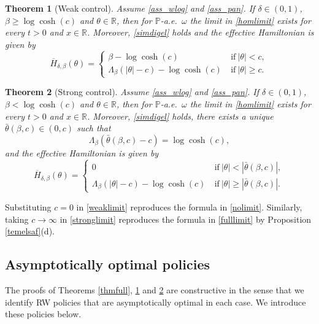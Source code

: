 \documentclass[a4paper]{amsart}
\numberwithin{equation}{section}
\theoremstyle{plain}
\newtheorem{theorem}{\sc Theorem}[section]
\theoremstyle{remark}
\begin{document}
\begin{theorem}[Weak control]\label{thmweak}
Assume \eqref{ass_wlog} and \eqref{ass_pan}. If $\delta\in(0,1)$, $\beta \ge \log\cosh(c)$ and $\theta\in\mathbb{R}$, then for $\mathbb{P}$-a.e.\ $\omega$ the limit in \eqref{homlimit} exists for every $t>0$ and $x\in\mathbb{R}$. Moreover, \eqref{simdigel} holds and the effective Hamiltonian is given by
\begin{equation}\label{weaklimit}
\overline H_{\delta,\beta}(\theta) = \begin{cases}
\beta - \log\cosh(c)&\ \text{if}\ |\theta| < c,\\
\Lambda_\beta(|\theta| - c) - \log\cosh(c)&\ \text{if}\ |\theta| \ge c.
\end{cases}
\end{equation}
\end{theorem}

\begin{theorem}[Strong control]\label{thmstrong}
Assume \eqref{ass_wlog} and \eqref{ass_pan}. If $\delta\in(0,1)$, $\beta < \log\cosh(c)$ and $\theta\in\mathbb{R}$, then for $\mathbb{P}$-a.e.\ $\omega$ the limit in \eqref{homlimit} exists for every $t>0$ and $x\in\mathbb{R}$. Moreover, \eqref{simdigel} holds, there exists a unique $\bar\theta(\beta,c)\in(0,c)$ such that
$$\Lambda_\beta(\bar\theta(\beta,c)-c) = \log\cosh(c),$$
and the effective Hamiltonian is given by
\begin{equation}\label{stronglimit}
\overline H_{\delta,\beta}(\theta) = \begin{cases}
0&\ \text{if}\ |\theta| < |\bar\theta(\beta,c)|,\\
\Lambda_{\beta}(|\theta| - c) - \log\cosh(c)&\ \text{if}\ |\theta| \ge |\bar\theta(\beta,c)|.
\end{cases}
\end{equation}
\end{theorem}

Substituting $c=0$ in \eqref{weaklimit} reproduces the formula in \eqref{nolimit}. Similarly, taking $c\to\infty$ in \eqref{stronglimit} reproduces the formula in \eqref{fulllimit} by Proposition \ref{temelsaf}(d).

\subsection{Asymptotically optimal policies}\label{asop}

The proofs of Theorems \ref{thmfull}, \ref{thmweak} and \ref{thmstrong} are constructive in the sense that we identify RW policies that are asymptotically optimal in each case. We introduce these policies below.
\end{document}
